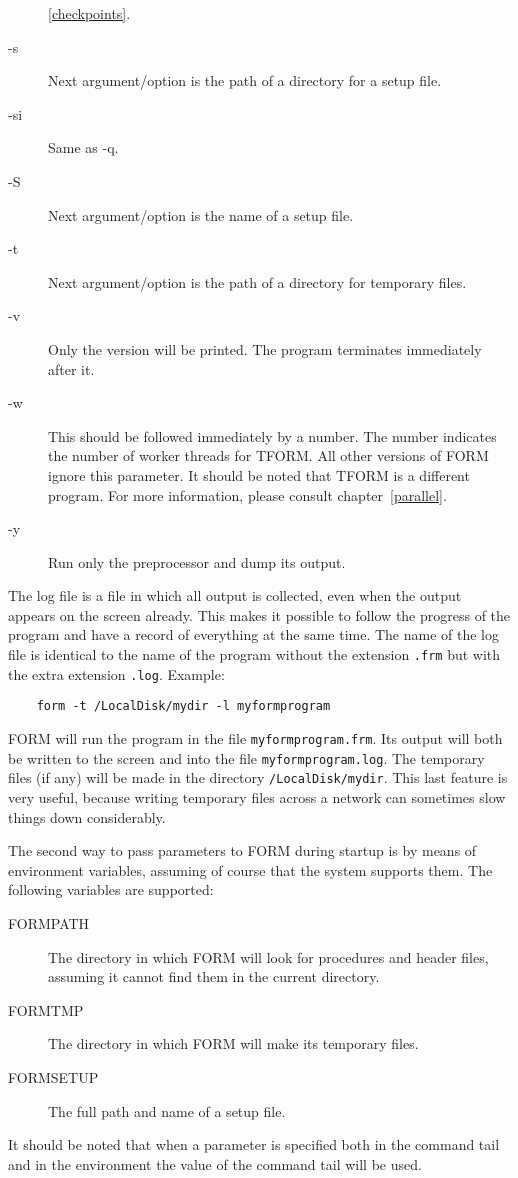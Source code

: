 \begin{description}
     \ref{checkpoints}.
\item[-s] Next argument/option is the path of a directory for a 
     setup file.
\item[-si] Same as -q.
\item[-S] Next argument/option is the name of a setup file.
\item[-t] Next argument/option is the path of a directory for temporary files.
\item[-v] Only the version will be printed. The program terminates 
     immediately after it.
\item[-w] This should be followed immediately by a number. The 
     number indicates the number of worker threads for TFORM. All other 
     versions of FORM ignore this parameter. It should be noted that TFORM 
     is a different program. For more information, please consult 
     chapter~\ref{parallel}.
\item[-y] Run only the preprocessor and dump its output.
\end{description}

\noindent The log file is a file in which all 
output is collected, even when the output appears on the screen already. 
This makes it possible to follow the progress of the program and have a 
record of everything at the same time. The name of the log file is 
identical to the name of the program without the extension \verb:.frm: but 
with the extra extension \verb:.log:.
Example:
\begin{center}
\begin{verbatim}
	form -t /LocalDisk/mydir -l myformprogram
\end{verbatim}
\end{center}
FORM will run the program in the file \verb:myformprogram.frm:. Its output 
will both be written to the screen and into the file 
\verb:myformprogram.log:. The temporary files (if any) will be made in the 
directory \verb:/LocalDisk/mydir:. This last feature is very useful, 
because writing temporary files across a network can sometimes slow things 
down considerably.

The second way to pass parameters to FORM during startup is by means of 
environment variables, assuming of course that 
the system supports them. The following variables are supported:
\begin{description}
\item[FORMPATH] The directory in which FORM will look for 
procedures and header files, assuming it cannot find them in the current 
directory.
\item[FORMTMP] The directory in which FORM will make its 
temporary files.
\item[FORMSETUP] The full path and name of a setup 
file.
\end{description}
It should be noted that when a parameter is specified both in the command 
tail and in the environment the value of the command tail will be used.

